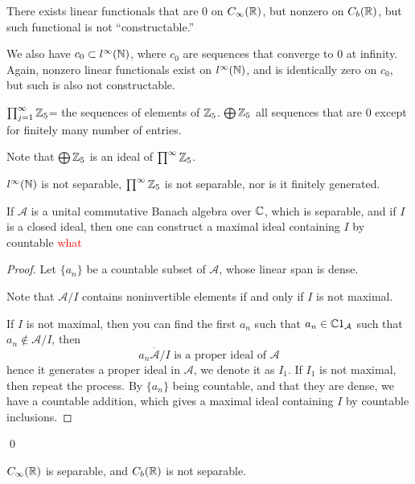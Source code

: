 There exists linear functionals that are 0 on $C_\infty(\mathbb{R})$, but nonzero on $C_b(\mathbb{R})$, but such functional is not ``constructable.''

We also have $c_0\subset l^\infty(\mathbb{N})$, where $c_0$ are sequences that converge to 0 at infinity. Again, nonzero linear functionals exist on $l^\infty(\mathbb{N})$, and is identically zero on $c_0$, but such is also not constructable.

\begin{definition}
    $\prod_{j=1}^\infty \mathbb{Z}_5$= the sequences of elements of $\mathbb{Z}_5$.
    $\bigoplus \mathbb{Z}_5$ all sequences that are 0 except for finitely many number of entries.
\end{definition}
Note that $\bigoplus\mathbb{Z}_5$ is an ideal of $\prod^\infty\mathbb{Z}_5$. 

\begin{proposition}
    $l^\infty(\mathbb{N})$ is not separable, $\prod^\infty \mathbb{Z}_5$ is not separable, nor is it finitely generated.
\end{proposition}

\begin{proposition}
    If $\mathcal{A}$ is a unital commutative Banach algebra over $\mathbb{C}$, which is separable, and if $I$ is a closed ideal, then one can construct a maximal ideal containing $I$ by countable \textcolor{red}{what}
\end{proposition}
\begin{proof}
    Let $\{a_n\}$ be a countable subset of $\mathcal{A}$, whose linear span is dense.  
    \begin{lemma}
        Note that $\mathcal{A}/I$ contains noninvertible elements if and only if $I$ is not maximal.
    \end{lemma}
    If $I$ is not maximal, then you can find the first $a_n$ such that $a_n\in\mathbb{C} 1_\mathcal{A}$ such that $a_n\not\in \mathcal{A}/I$, then 
    \begin{equation*}
        \overline{a_n\mathcal{A}/I} \text{ is a proper ideal of } \mathcal{A}
    \end{equation*}
    hence it generates a proper ideal in $\mathcal{A}$, we denote it as $I_1$. If $I_1$ is not maximal, then repeat the process. By $\{a_n\}$ being countable, and that they are dense, we have a countable addition, which gives a maximal ideal containing $I$ by countable inclusions.
\end{proof}
\qed

\begin{remark}
    $C_\infty(\mathbb{R})$ is separable, and $C_b(\mathbb{R})$ is not separable.
\end{remark}


